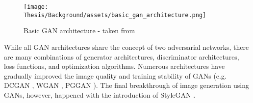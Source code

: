 \begin{figure}[ht]
    \centering
    \texttt{[image: Thesis/Background/assets/basic\_gan\_architecture.png]}
    \caption[Basic GAN architecture]{Basic GAN architecture - taken from \cite{little2021generative}} 
    \label{fig:gan_architecture}
\end{figure}
While all GAN architectures share the concept of two adversarial networks, there are many combinations of generator architectures, discriminator architectures, loss functions, and optimization algorithms. Numerous architectures have gradually improved the image quality and training stability of GANs (e.g. DCGAN \citep{radford2015unsupervised}, WGAN \citep{arjovsky2017wasserstein}, PGGAN \citep{karras2017progressive}). The final breakthrough of image generation using GANs, however, happened with the introduction of StyleGAN \citep{stylegan1}. \\
